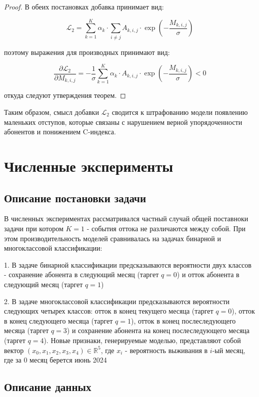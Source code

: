 \documentclass[a4paper,14pt,oneside,openany]{memoir}
\begin{document}
\begin{proof}
	В обеих постановках добавка принимает вид: 
	
	$$\mathcal{L}_2 =\sum_{k=1}^K\alpha_k\cdot\sum_{i\neq j}A_{k,i,j}\cdot\exp\left(-\frac{M_{k,i,j}}{\sigma}\right)$$
	
	поэтому выражения для производных принимают вид: 
	
	$$ 
	\frac{\partial \mathcal{L}_2}{\partial M_{k,i,j}} = 
	-\frac{1}{\sigma} \sum_{k=1}^K\alpha_k\cdot A_{k,i,j}\cdot\exp\left(-\frac{M_{k,i,j}}{\sigma}\right) < 0
	 $$
	
	откуда следуют утверждения теорем.
\end{proof}


Таким образом, смысл добавки $\mathcal{L}_2$ сводится к штрафованию модели появлению маленьких отступов, которые связаны с нарушением верной упорядоченности абонентов и понижением C-индекса. 


\chapter{Численные эксперименты}

\section{Описание постановки задачи}

В численных экспериментах рассматривался частный случай общей поставноки задачи при котором $K = 1$ - события оттока не различаются между собой. При этом производительность моделей сравнивалась на задачах бинарной и многоклассовой классификации: 

1. В задаче бинарной классификации предсказываются вероятности двух классов - сохранение абонента в следующий месяц (таргет $q = 0$) и отток абонента в следующий месяц (таргет $q = 1$)

2. В задаче многоклассовой классификации предсказываются вероятности следующих четырех классов: отток в конец текущего месяца (таргет $q = 0$), отток в конец следующего месяца (таргет $q = 1$), отток в конец послеследующего месяца (таргет $q = 3$) и сохранение абонента на конец послеследующего месяца (таргет $q = 4$). Новые признаки, генерируемые моделью, представляют собой вектор $(x_0,x_1,x_2,x_3,x_4) \in \mathbb{R}^{5}$, где $x_i$ - вероятность выживания в $i$-ый месяц, где за $0$ месяц берется июнь 2024




\section{Описание данных}
\end{document}
